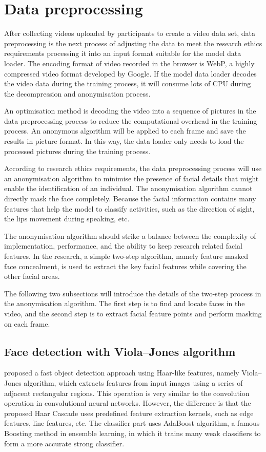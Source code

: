 \section{Data preprocessing}
\label{sec:Data preprocessing} %
After collecting videos uploaded by participants to create a video data set, data preprocessing is the next process of adjusting the data to meet the research ethics requirements processing it into an input format suitable for the model data loader.
The encoding format of video recorded in the browser is WebP, a highly compressed video format developed by Google.
If the model data loader decodes the video data during the training process, it will consume lots of CPU during the decompression and anonymisation process.

An optimisation method is decoding the video into a sequence of pictures in the data preprocessing process to reduce the computational overhead in the training process.
An anonymous algorithm will be applied to each frame and save the results in picture format.
In this way, the data loader only needs to load the processed pictures during the training process.

According to research ethics requirements, the data preprocessing process will use an anonymisation algorithm to minimise the presence of facial details that might enable the identification of an individual.
The anonymisation algorithm cannot directly mask the face completely.
Because the facial information contains many features that help the model to classify activities, such as the direction of sight, the lips movement during speaking, etc.

The anonymisation algorithm should strike a balance between the complexity of implementation, performance, and the ability to keep research related facial features.
In the research, a simple two-step algorithm, namely feature masked face concealment, is used to extract the key facial features while covering the other facial areas.

The following two subsections will introduce the details of the two-step process in the anonymisation algorithm.
The first step is to find and locate faces in the video, and the second step is to extract facial feature points and perform masking on each frame.

\subsection{Face detection with Viola–Jones algorithm} %
\citet{viola2001rapid} proposed a fast object detection approach using Haar-like features, namely Viola–Jones algorithm, which extracts features from input images using a series of adjacent rectangular regions.
This operation is very similar to the convolution operation in convolutional neural networks.
However, the difference is that the proposed Haar Cascade uses predefined feature extraction kernels, such as edge features, line features, etc.
The classifier part uses AdaBoost algorithm, a famous Boosting method in ensemble learning, in which it trains many weak classifiers to form a more accurate strong classifier.

